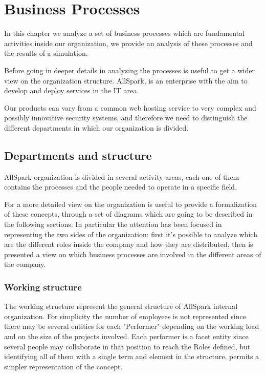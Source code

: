 \chapter{Business Processes}
In this chapter we analyze a set of business processes which are
fundamental activities inside our organization, we provide an analysis of
these processes and the results of a simulation.
 
Before going in deeper details in analyzing the processes is useful to get
a wider view on the organization structure.
AllSpark, is an enterprise with the aim to develop and deploy services in
the IT area.
 
Our products can vary from a common web hosting service to very complex and
possibly innovative security systems, and therefore we need to distinguish
the different departments in which our organization is divided.
 
\section{Departments and structure}
AllSpark organization is divided in several activity areas, each one of them
contains the processes and the people needed to operate in a specific
field.
 
For a more detailed view on the organization is useful to provide a
formalization of these concepts, through a set of diagrams which are going
to be described in the following sections. In particular the attention has
been focused in representing the two sides of the organization: first it's
possible to analyze which are the different roles inside the company and
how they are distributed, then is presented a view on which business
processes are involved in the different areas of the company.
 
\subsection{Working structure}
The working structure represent the general structure of AllSpark internal
organization. For simplicity the number of employees is not represented
since there may be several entities for each "Performer" depending on the
working load and on the size of the projects involved. Each performer is a
facet entity since several people may collaborate in that position to reach
the Roles defined, but identifying all of them with a single term and
element in the structure, permits a simpler representation of the concept.
 
